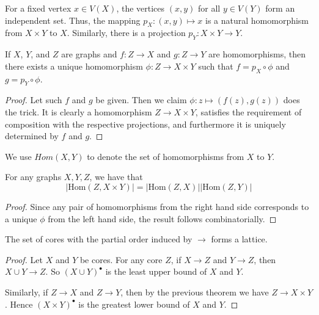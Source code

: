 For a fixed vertex $x\in V(X)$, the vertices $(x,y)$ for all $y\in V(Y)$ form an independent set.  Thus, the mapping $p_X:(x,y)\mapsto x$ is a natural homomorphism from $X\times Y$ to $X$.  Similarly, there is a projection $p_Y:X\times Y\rightarrow Y$.

\begin{theorem}
	If $X$, $Y$, and $Z$ are graphs and $f:Z\rightarrow X$ and $g:Z\rightarrow Y$ are homomorphisms, then there exists a unique homomorphism $\phi:Z\rightarrow X\times Y$ such that $f=p_X\circ \phi$ and $g=p_Y\circ \phi$.
\end{theorem}

\begin{proof}
	Let such $f$ and $g$ be given.  Then we claim $\phi:z\mapsto(f(z),g(z))$ does the trick.  It is clearly a homomorphism $Z\rightarrow X\times Y$, satisfies the requirement of composition with the respective projections, and furthermore it is uniquely determined by $f$ and $g$.
\end{proof}

We use $Hom(X,Y)$ to denote the set of homomorphisms from $X$ to $Y$.

\begin{corollary}
	For any graphs $X,Y,Z$, we have that $$|\text{Hom}(Z,X\times Y)|=|\text{Hom}(Z,X)||\text{Hom}(Z,Y)|$$
\end{corollary}
\begin{proof}
	Since any pair of homomorphisms from the right hand side corresponds to a unique $\phi$ from the left hand side, the result follows combinatorially.
\end{proof}


\begin{lemma}
	The set of cores with the partial order induced by $\rightarrow$ forms a lattice.
\end{lemma}
\begin{proof}
	Let $X$ and $Y$ be cores.  For any core $Z$, if $X\rightarrow Z$ and $Y\rightarrow Z$, then $X\cup Y\rightarrow Z$.  So $(X\cup Y)^\bullet$ is the least upper bound of $X$ and $Y$.
	
	Similarly, if $Z\rightarrow X$ and $Z\rightarrow Y$, then by the previous theorem we have $Z\rightarrow X\times Y$.  Hence $(X\times Y)^\bullet$ is the greatest lower bound of $X$ and $Y$. 
\end{proof}

